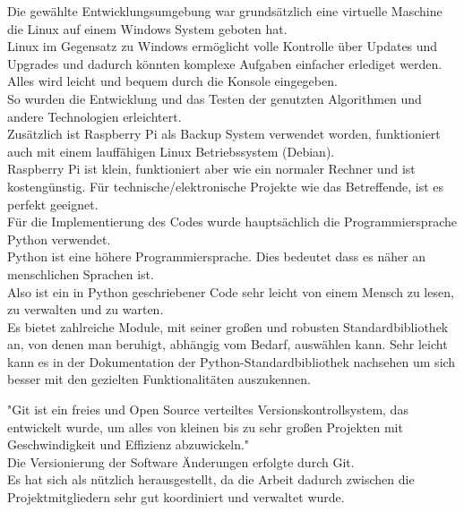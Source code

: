 \begin{flushleft}
	Die gewählte Entwicklungsumgebung war grundsätzlich eine virtuelle Maschine die
	Linux auf einem Windows System geboten hat. \\
	Linux im Gegensatz zu Windows ermöglicht volle Kontrolle über Updates und
	Upgrades und dadurch könnten komplexe Aufgaben einfacher erlediget werden.\\
	Alles wird leicht und bequem durch die Konsole eingegeben. \\
	So wurden die Entwicklung und das Testen der genutzten Algorithmen und andere
	Technologien erleichtert. \cite{linx}\\
	
	Zusätzlich ist Raspberry Pi als Backup System verwendet worden, funktioniert
	auch mit einem lauffähigen Linux Betriebssystem (Debian). \\
	Raspberry Pi ist klein, funktioniert aber wie ein normaler Rechner und ist 
	kostengünstig. Für technische/elektronische Projekte wie das Betreffende, ist es
	perfekt geeignet. \\ 
	Für die Implementierung des Codes wurde hauptsächlich die Programmiersprache
	Python verwendet. \\
	Python ist eine höhere Programmiersprache. Dies bedeutet dass es näher an
	menschlichen Sprachen ist. \\
	Also ist ein in Python geschriebener Code sehr leicht von einem Mensch zu lesen,
	zu verwalten und zu warten.  \\ 
	
	Es bietet zahlreiche Module, mit seiner großen und robusten Standardbibliothek
	an, von denen man beruhigt, abhängig vom Bedarf, auswählen kann.  
	Sehr leicht kann es in der Dokumentation der Python-Standardbibliothek nachsehen
	um sich besser mit den gezielten Funktionalitäten auszukennen. \\
	\cite{why_python}
	
	
	"Git ist ein freies und Open Source verteiltes Versionskontrollsystem, das
	entwickelt wurde, um alles von kleinen bis zu sehr großen Projekten mit
	Geschwindigkeit und Effizienz abzuwickeln." \cite{Git1} \\
	Die Versionierung der Software Änderungen erfolgte durch Git.\\
	Es hat sich als nützlich herausgestellt, da die Arbeit dadurch zwischen die
	Projektmitgliedern sehr gut koordiniert und verwaltet wurde. \\
	
\end{flushleft}



